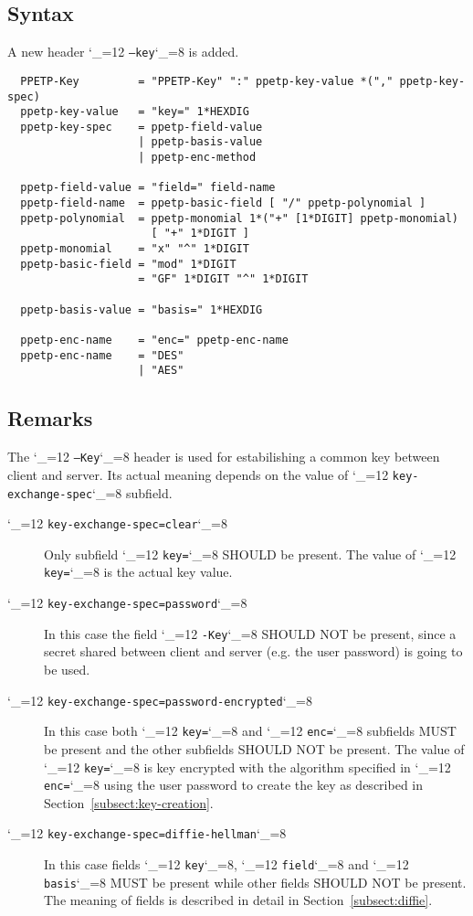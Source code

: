 \documentclass{rfc}
\def\ttt{\catcode`\_=12 \tttii}
\def\tttii#1!{{\tt #1}\catcode`\_=8{}}
\begin{document}
\subsection{Syntax}
\label{sub:3.1.0;transport_layer}

A new header \ttt\ppetp--key! is added.

\begin{verbatim}
  PPETP-Key         = "PPETP-Key" ":" ppetp-key-value *("," ppetp-key-spec)
  ppetp-key-value   = "key=" 1*HEXDIG
  ppetp-key-spec    = ppetp-field-value
                    | ppetp-basis-value
                    | ppetp-enc-method

  ppetp-field-value = "field=" field-name
  ppetp-field-name  = ppetp-basic-field [ "/" ppetp-polynomial ]
  ppetp-polynomial  = ppetp-monomial 1*("+" [1*DIGIT] ppetp-monomial)
                      [ "+" 1*DIGIT ]
  ppetp-monomial    = "x" "^" 1*DIGIT 
  ppetp-basic-field = "mod" 1*DIGIT
                    = "GF" 1*DIGIT "^" 1*DIGIT

  ppetp-basis-value = "basis=" 1*HEXDIG

  ppetp-enc-name    = "enc=" ppetp-enc-name
  ppetp-enc-name    = "DES"
                    | "AES"
\end{verbatim}

\subsection{Remarks}
\label{sub:3.1.1;transport_layer}

The \ttt\ppetp--Key! header is used for estabilishing a common key
between client and server.  Its actual meaning depends on the value of
\ttt key-exchange-spec! subfield.

\begin{description}
\item[\ttt key-exchange-spec=clear!] Only subfield \ttt key=! SHOULD
  be present.  The value of  \ttt key=! is the actual key value.
\item[\ttt key-exchange-spec=password!] In this case the field
  \ttt\ppetp-Key! SHOULD NOT be present, since a secret shared between
  client and server (e.g. the user password) is going to be used. 
\item[\ttt key-exchange-spec=password-encrypted!] In this case both
  \ttt key=! and \ttt enc=! subfields MUST be present and the other
  subfields SHOULD NOT be present.  The value of  \ttt key=! is key
  encrypted with the algorithm specified in \ttt enc=! using the user
  password to create the key as described in
  Section~\ref{subsect:key-creation}. 
\item[\ttt key-exchange-spec=diffie-hellman!] In this case fields 
  \ttt key!,   \ttt field! and \ttt basis! MUST be present while other
  fields SHOULD NOT be present.  The meaning of fields is described in
  detail in   Section~\ref{subsect:diffie}.
\end{description}
%
\end{document}
